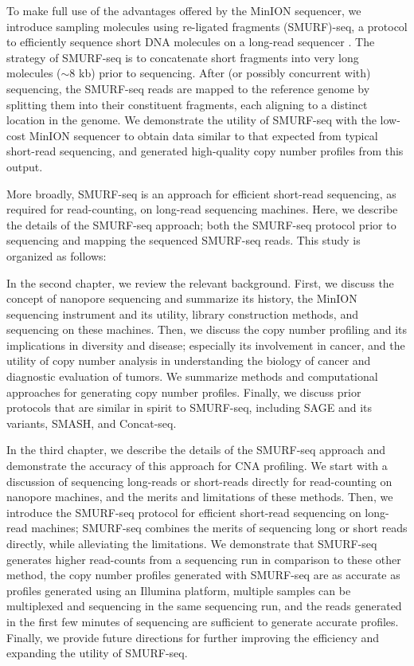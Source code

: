 To make full use of the advantages offered by the MinION sequencer, we
introduce sampling molecules using re-ligated fragments (SMURF)-seq, a
protocol to efficiently sequence short DNA molecules on a long-read
sequencer \citep{prabakar2019smurf}. The strategy of SMURF-seq is to
concatenate short fragments into very long molecules ($\sim$8 kb) prior
to sequencing. After (or possibly concurrent with) sequencing, the
SMURF-seq reads are mapped to the reference genome by splitting them
into their constituent fragments, each aligning to a distinct location
in the genome.
%
We demonstrate the utility of SMURF-seq with the low-cost MinION
sequencer to obtain data similar to that expected from typical
short-read sequencing, and generated high-quality copy number profiles
from this output.

More broadly, SMURF-seq is an approach for efficient short-read
sequencing, as required for read-counting, on long-read sequencing
machines. Here, we describe the details of the SMURF-seq approach; both
the SMURF-seq protocol prior to sequencing and mapping the sequenced
SMURF-seq reads. This study is organized as follows:

In the second chapter, we review the relevant background.  First, we
discuss the concept of nanopore sequencing and summarize its history,
the MinION sequencing instrument and its utility, library construction
methods, and sequencing on these machines.
%
Then, we discuss the copy number profiling and its implications in
diversity and disease; especially its involvement in cancer, and the
utility of copy number analysis in understanding the biology of cancer
and diagnostic evaluation of tumors. We summarize methods and
computational approaches for generating copy number profiles.
%
Finally, we discuss prior protocols that are similar in spirit to
SMURF-seq, including SAGE and its variants, SMASH, and Concat-seq.

In the third chapter, we describe the details of the SMURF-seq approach
and demonstrate the accuracy of this approach for CNA profiling.  We
start with a discussion of sequencing long-reads or short-reads directly
for read-counting on nanopore machines, and the merits and limitations
of these methods.
%
Then, we introduce the SMURF-seq protocol for efficient short-read
sequencing on long-read machines; SMURF-seq combines the merits of
sequencing long or short reads directly, while alleviating the
limitations.
%
We demonstrate that SMURF-seq generates higher read-counts from a
sequencing run in comparison to these other method, the copy number
profiles generated with SMURF-seq are as accurate as profiles generated
using an Illumina platform, multiple samples can be multiplexed and
sequencing in the same sequencing run, and the reads generated in the
first few minutes of sequencing are sufficient to generate accurate
profiles.
%
Finally, we provide future directions for further improving the
efficiency and expanding the utility of SMURF-seq.

